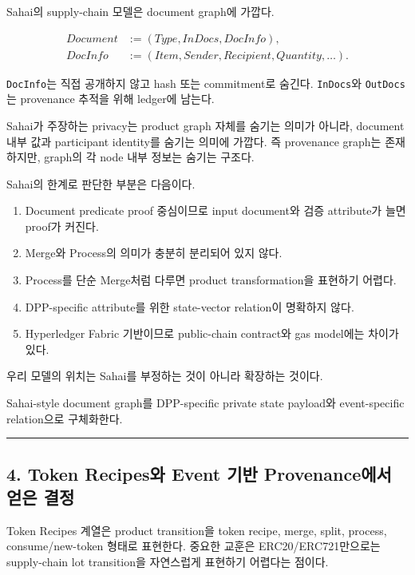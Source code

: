 \documentclass[11pt]{extarticle}
\begin{document}
Sahai의 supply-chain 모델은 document graph에 가깝다.

\[
\begin{aligned}
\mathit{Document} &:= (\mathit{Type},\mathit{InDocs},\mathit{DocInfo}),\\
\mathit{DocInfo} &:= (\mathit{Item},\mathit{Sender},\mathit{Recipient},
\mathit{Quantity},\ldots).
\end{aligned}
\]

\texttt{DocInfo}는 직접 공개하지 않고 hash 또는 commitment로 숨긴다.
\texttt{InDocs}와 \texttt{OutDocs}는 provenance 추적을 위해 ledger에
남는다.

Sahai가 주장하는 privacy는 product graph 자체를 숨기는 의미가 아니라,
document 내부 값과 participant identity를 숨기는 의미에 가깝다. 즉
provenance graph는 존재하지만, graph의 각 node 내부 정보는 숨기는
구조다.

Sahai의 한계로 판단한 부분은 다음이다.

\begin{enumerate}
  \item Document predicate proof 중심이므로 input document와 검증 attribute가 늘면
  proof가 커진다.
  \item Merge와 Process의 의미가 충분히 분리되어 있지 않다.
  \item Process를 단순 Merge처럼 다루면 product transformation을 표현하기 어렵다.
  \item DPP-specific attribute를 위한 state-vector relation이 명확하지 않다.
  \item Hyperledger Fabric 기반이므로 public-chain contract와 gas model에는 차이가 있다.
\end{enumerate}

우리 모델의 위치는 Sahai를 부정하는 것이 아니라 확장하는 것이다.

Sahai-style document graph를 DPP-specific private state payload와 event-specific
relation으로 구체화한다.

\begin{center}\rule{0.5\linewidth}{0.5pt}\end{center}

\subsection{4. Token Recipes와 Event 기반 Provenance에서 얻은
결정}\label{4-token-recipesuxc640-event-uxae30uxbc18-provenanceuxc5d0uxc11c-uxc5bbuxc740-uxacb0uxc815}

Token Recipes 계열은 product transition을 token recipe, merge, split,
process, consume/new-token 형태로 표현한다. 중요한 교훈은
ERC20/ERC721만으로는 supply-chain lot transition을 자연스럽게 표현하기
어렵다는 점이다.
\end{document}

